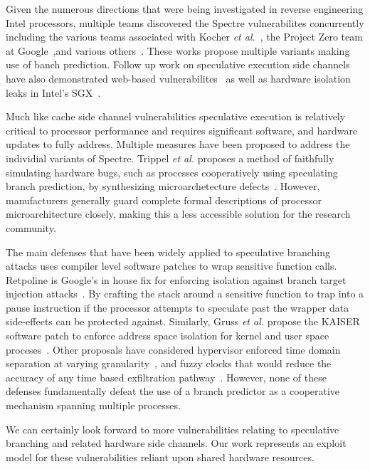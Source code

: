 Given the numerous directions that were being investigated in reverse engineering 
Intel processors, multiple teams discovered the Spectre vulnerabilites concurrently including the 
various teams associated with Kocher \textit{et al.}~\cite{spectre}, the Project Zero team 
at Google~\cite{project_zero},and various others~\cite{evtyushkin2018branchscope,maisuradze2018speculose}. 
These works propose multiple variants making use of banch prediction.  Follow 
up work on speculative execution side channels have also demonstrated
web-based vulnerabilites~\cite{genkin2018drive} as well as hardware isolation  
leaks in Intel's SGX~\cite{spectre_sgx}. 


Much like cache side channel vulnerabilities speculative execution is relatively
critical to processor performance and requires significant software, and hardware 
updates to fully address. Multiple measures have been proposed to address the 
individial variants of Spectre.  Trippel \textit{et al.} proposes a method of faithfully simulating 
hardware bugs, such as processes cooperatively using speculating branch prediction,
by synthesizing microarchetecture defects~\cite{trippel2018meltdownprime}. However, 
manufacturers generally guard complete formal descriptions of processor microarchitecture closely, 
making this a less accessible solution for the research community. 

The main defenses that have been widely applied to 
speculative branching attacks uses compiler level software patches to wrap sensitive 
function calls. Retpoline is Google's in house fix for enforcing 
isolation against branch target injection attacks~\cite{retpoline}. By crafting 
the stack around a sensitive function to trap into a pause instruction if the processor 
attempts to speculate past the wrapper data side-effects can be protected against. 
Similarly, Gruss \textit{et al.} propose the KAISER software patch to enforce address space
isolation for kernel and user space proceses~\cite{gruss2017kaslr}. 
Other proposals have considered hypervisor enforced time domain separation at varying 
granularity~\cite{renau2018securing}, and fuzzy clocks that would reduce the accuracy 
of any time based exfiltration pathway~\cite{hu1992reducing}. However, none of these defenses 
fundamentally defeat the use of a branch predictor as a cooperative mechanism
spanning multiple processes. 

\smallskip

We can certainly look forward to more vulnerabilities relating to speculative 
branching and related hardware side channels. Our work represents an exploit 
model for these vulnerabilities reliant upon shared hardware resources. 



